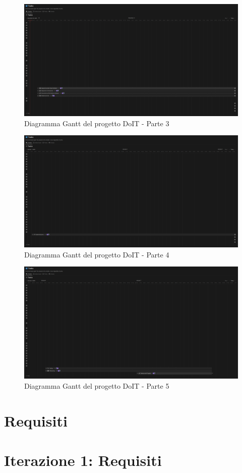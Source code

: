 \documentclass[a4paper,12pt]{report}
\begin{document}
    \begin{figure}[h!]
        \centering
        \includegraphics[width=\textwidth]{gantt-3}
        \caption{Diagramma Gantt del progetto DoIT - Parte 3}
        \label{fig:gantt3}
    \end{figure}

    \begin{figure}[h!]
        \centering
        \includegraphics[width=\textwidth]{gantt-4}
        \caption{Diagramma Gantt del progetto DoIT - Parte 4}
        \label{fig:gantt4}
    \end{figure}

    \begin{figure}[h!]
        \centering
        \includegraphics[width=\textwidth]{gantt-5}
        \caption{Diagramma Gantt del progetto DoIT - Parte 5}
        \label{fig:gantt5}
    \end{figure}

    \newpage

    \chapter{Requisiti}\label{ch:requisiti}

    \newpage

    \chapter{Iterazione 1: Requisiti}\label{ch:iterazione-1:-requisiti}
\end{document}
